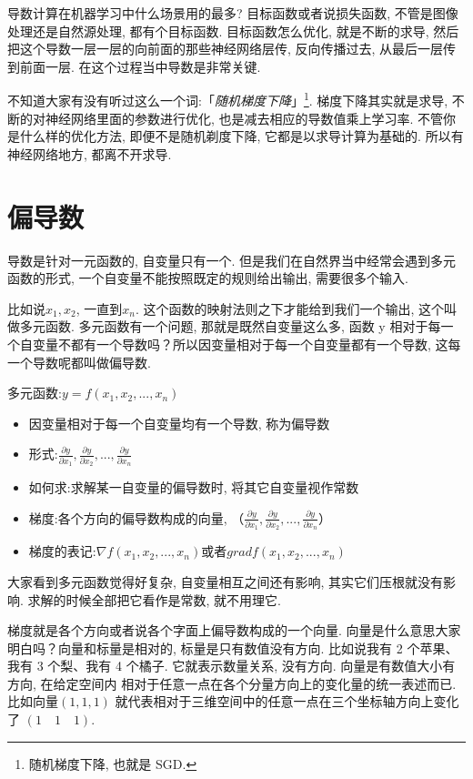导数计算在机器学习中什么场景用的最多? 目标函数或者说损失函数, 不管是图像处理还是自然源处理, 都有个目标函数. 目标函数怎么优化, 就是不断的求导, 然后把这个导数一层一层的向前面的那些神经网络层传, 反向传播过去, 从最后一层传到前面一层. 在这个过程当中导数是非常关键. 

不知道大家有没有听过这么一个词:「\textit{随机梯度下降}」\footnote{随机梯度下降, 也就是 SGD. }. 梯度下降其实就是求导, 不断的对神经网络里面的参数进行优化, 也是减去相应的导数值乘上学习率. 不管你是什么样的优化方法, 即便不是随机剃度下降, 它都是以求导计算为基础的. 所以有神经网络地方, 都离不开求导. 

\section{偏导数}

导数是针对一元函数的, 自变量只有一个. 但是我们在自然界当中经常会遇到多元函数的形式, 一个自变量不能按照既定的规则给出输出, 需要很多个输入. 

比如说$x_1, x_2$, 一直到$x_n$. 这个函数的映射法则之下才能给到我们一个输出, 这个叫做多元函数. 多元函数有一个问题, 那就是既然自变量这么多, 函数 y 相对于每一个自变量不都有一个导数吗？所以因变量相对于每一个自变量都有一个导数, 这每一个导数呢都叫做偏导数. 

多元函数:$y=f(x_1, x_2, ..., x_n)$

\begin{itemize}
  \item 因变量相对于每一个自变量均有一个导数, 称为偏导数
  \item 形式:$\frac{\partial y}{\partial x_1}, \frac{\partial y}{\partial x_2}, ..., \frac{\partial y}{\partial x_n}$
  \item 如何求:求解某一自变量的偏导数时, 将其它自变量视作常数
  \item 梯度:各个方向的偏导数构成的向量, （$\frac{\partial y}{\partial x_1},\frac{\partial y}{\partial x_2}, ..., \frac{\partial y}{\partial x_n}$）
  \item 梯度的表记:$\nabla f(x_1, x_2, ..., x_n)$或者$grad f(x_1, x_2, ..., x_n)$
\end{itemize}

大家看到多元函数觉得好复杂, 自变量相互之间还有影响, 其实它们压根就没有影响. 求解的时候全部把它看作是常数, 就不用理它. 

梯度就是各个方向或者说各个字面上偏导数构成的一个向量. 向量是什么意思大家明白吗？向量和标量是相对的, 标量是只有数值没有方向. 比如说我有 2 个苹果、我有 3 个梨、我有 4 个橘子. 它就表示数量关系, 没有方向. 向量是有数值大小有方向, 在给定空间内 相对于任意一点在各个分量方向上的变化量的统一表述而已. 比如向量$(1, 1, 1)$ 就代表相对于三维空间中的任意一点在三个坐标轴方向上变化了 $(1 \quad 1 \quad 1)$. 

